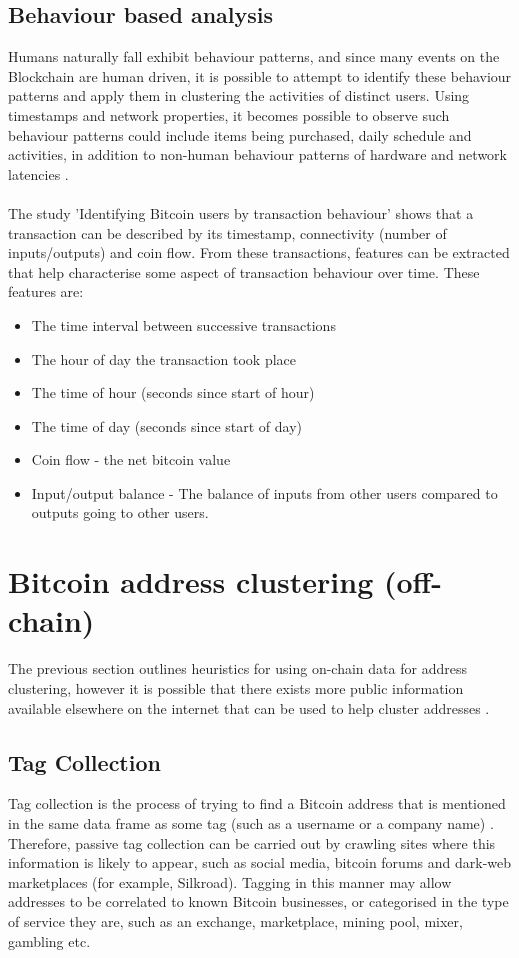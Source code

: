 \subsection{Behaviour based analysis}
Humans naturally fall exhibit behaviour patterns, and since many events on the Blockchain are human driven, it is possible to attempt to identify these behaviour patterns and apply them in clustering the activities of distinct users. Using timestamps and network properties, it becomes possible to observe such behaviour patterns could include items being purchased, daily schedule and activities, in addition to non-human behaviour patterns of hardware and network latencies \cite{RefWorks:doc:5c3f3459e4b042abd3bceede}. 
\\\\
The study 'Identifying Bitcoin users by transaction behaviour' \cite{RefWorks:doc:5c3f3459e4b042abd3bceede} shows that a transaction can be described by its timestamp, connectivity (number of inputs/outputs) and coin flow. From these transactions, features can be extracted that help characterise some aspect of transaction behaviour over time. These features are: 
\begin{itemize}
    \item The time interval between successive transactions
    \item The hour of day the transaction took place
    \item The time of hour (seconds since start of hour)
    \item The time of day (seconds since start of day)
    \item Coin flow - the net bitcoin value  
    \item Input/output balance - The balance of inputs from other users compared to outputs going to other users.
\end{itemize}


\section{Bitcoin address clustering (off-chain)}
The previous section outlines heuristics for using on-chain data for address clustering, however it is possible that there exists more public information available elsewhere on the internet that can be used to help cluster addresses \cite{RefWorks:doc:5c3ef27be4b03c7dd82ce4e6}. 

\subsection{Tag Collection}\label{background-tag-collection}
Tag collection is the process of trying to find a Bitcoin address that is mentioned in the same data frame as some tag (such as a username or a company name) \cite{RefWorks:doc:5c3ef27be4b03c7dd82ce4e6}. Therefore, passive tag collection can be carried out by crawling sites where this information is likely to appear, such as social media, bitcoin forums and dark-web marketplaces (for example, Silkroad). Tagging in this manner may allow addresses to be correlated to known Bitcoin businesses, or categorised in the type of service they are, such as an exchange, marketplace, mining pool, mixer, gambling etc. 


